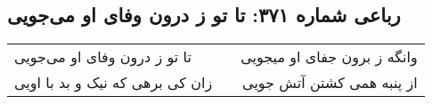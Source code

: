 \begin{center}
\section*{رباعی شماره ۳۷۱: تا تو ز درون وفای او می‌جویی}
\label{sec:sh371}
\begin{longtable}{l p{0.5cm} r}
تا تو ز درون وفای او می‌جویی
&&
وانگه ز برون جفای او میجویی
\\
زان کی برهی که نیک و بد با اویی
&&
از پنبه همی کشتن آتش جویی
\\
\end{longtable}
\end{center}
